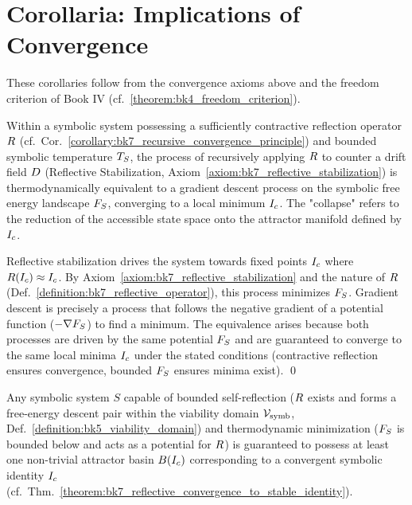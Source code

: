 \section{Corollaria: Implications of Convergence}
\label{sec:bk7_corollaria_implications_of_convergence}
These corollaries follow from the convergence axioms above and the freedom criterion of Book IV (cf.~\ref{theorem:bk4_freedom_criterion}).
\begin{corollary}
\label{corollary:bk7_drift_collapse_equivalence}
Within a symbolic system possessing a sufficiently contractive reflection operator \(R\) (cf.~Cor.~\ref{corollary:bk7_recursive_convergence_principle}) and bounded symbolic temperature \(T_S\), the process of recursively applying \(R\) to counter a drift field \(D\) (Reflective Stabilization, Axiom~\ref{axiom:bk7_reflective_stabilization}) is thermodynamically equivalent to a gradient descent process on the symbolic free energy landscape \(F_S\), converging to a local minimum \(I_c\). The "collapse" refers to the reduction of the accessible state space onto the attractor manifold defined by \(I_c\).
\end{corollary}
\begin{demonstratio}
\label{demonstratio:bk7_gradient_vs_reflective_dynamics}
Reflective stabilization drives the system towards fixed points \(I_c\) where \(R(I_c) \approx I_c\). By Axiom~\ref{axiom:bk7_reflective_stabilization} and the nature of \(R\) (Def.~\ref{definition:bk7_reflective_operator}), this process minimizes \(F_S\). Gradient descent is precisely a process that follows the negative gradient of a potential function (\(-\nabla F_S\)) to find a minimum. The equivalence arises because both processes are driven by the same potential \(F_S\) and are guaranteed to converge to the same local minima \(I_c\) under the stated conditions (contractive reflection ensures convergence, bounded \(F_S\) ensures minima exist). \qed
\end{demonstratio}
\begin{corollary}
\label{corollary:bk7_recursive_convergence_principle}
Any symbolic system \(S\) capable of bounded self-reflection (\(R\) exists and forms a free-energy descent pair within the viability domain \(\mathcal{V}_{\mathrm{symb}}\), Def.~\ref{definition:bk5_viability_domain}) and thermodynamic minimization (\(F_S\) is bounded below and acts as a potential for \(R\)) is guaranteed to possess at least one non-trivial attractor basin \(B(I_c)\) corresponding to a convergent symbolic identity \(I_c\) (cf.~Thm.~\ref{theorem:bk7_reflective_convergence_to_stable_identity}).
\end{corollary}

